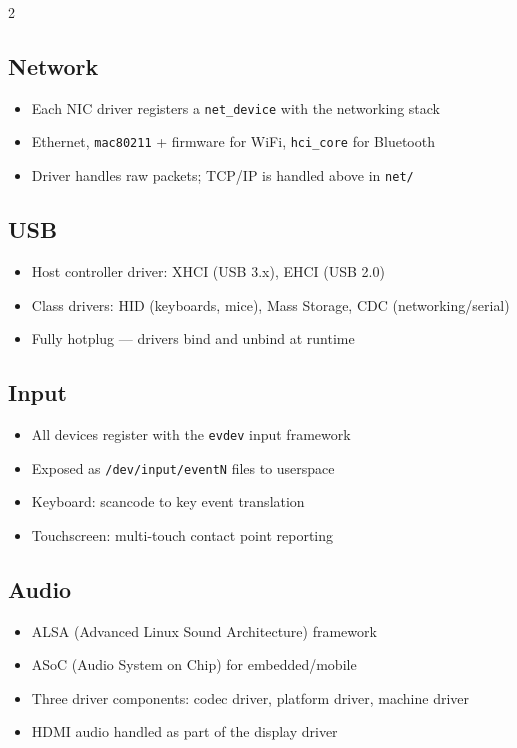2\documentclass[11pt,a4paper]{article}
\begin{document}
\subsection{Network}
\begin{itemize}[noitemsep]
  \item Each NIC driver registers a \texttt{net\_device} with the networking stack
  \item Ethernet, \texttt{mac80211} + firmware for WiFi, \texttt{hci\_core} for Bluetooth
  \item Driver handles raw packets; TCP/IP is handled above in \texttt{net/}
\end{itemize}

\subsection{USB}
\begin{itemize}[noitemsep]
  \item Host controller driver: XHCI (USB 3.x), EHCI (USB 2.0)
  \item Class drivers: HID (keyboards, mice), Mass Storage, CDC (networking/serial)
  \item Fully hotplug --- drivers bind and unbind at runtime
\end{itemize}

\subsection{Input}
\begin{itemize}[noitemsep]
  \item All devices register with the \texttt{evdev} input framework
  \item Exposed as \texttt{/dev/input/eventN} files to userspace
  \item Keyboard: scancode to key event translation
  \item Touchscreen: multi-touch contact point reporting
\end{itemize}

\subsection{Audio}
\begin{itemize}[noitemsep]
  \item ALSA (Advanced Linux Sound Architecture) framework
  \item ASoC (Audio System on Chip) for embedded/mobile
  \item Three driver components: codec driver, platform driver, machine driver
  \item HDMI audio handled as part of the display driver
\end{itemize}
\end{document}

